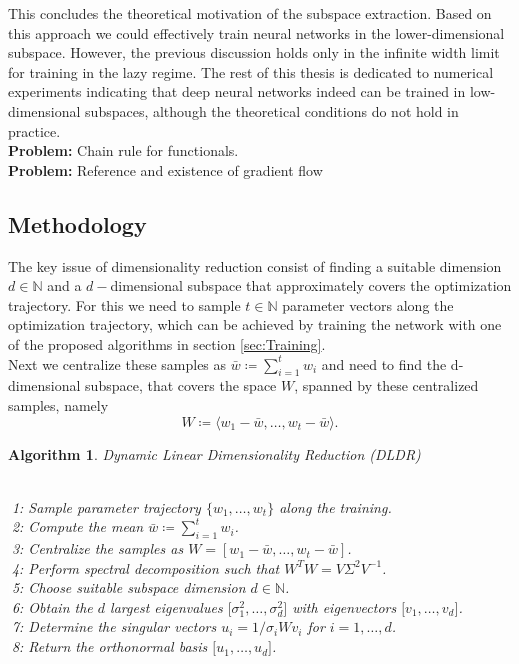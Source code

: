 \documentclass[11pt, a4paper]{article}
\newtheorem{algorithm}[theorem]{Algorithm}
\newcommand{\N}{\mathds{N}}
\begin{document}
This concludes the theoretical motivation of the subspace extraction. Based on this approach we could effectively train neural networks in the lower-dimensional subspace. However, the previous discussion holds only in the infinite width limit for training in the lazy regime. The rest of this thesis is dedicated to numerical experiments indicating that deep neural networks indeed can be trained in low-dimensional subspaces, although the theoretical conditions do not hold in practice. \\

\textbf{Problem:} Chain rule for functionals. \\
\textbf{Problem:} Reference and existence of gradient flow

\pagebreak
\subsection{Methodology}

The key issue of dimensionality reduction consist of finding a suitable dimension $d \in \N$ and a $d-$dimensional subspace that approximately covers the optimization trajectory. For this we need to sample $t \in \N$ parameter vectors along the optimization trajectory, which can be achieved by training the network with one of the proposed algorithms in section \ref{sec:Training}. \\

Next we centralize these samples as $\bar{w} \coloneq\sum_{i=1}^{t} w_i$ and need to find the d-dimensional subspace, that covers the space $W$, spanned by these centralized samples, namely
\[ W \coloneq \big \langle w_1 - \bar{w}, \dots, w_t - \bar{w} \big \rangle. \]

\begin{algorithm}
\caption{Dynamic Linear Dimensionality Reduction (DLDR)} \ \\
\textcolor{white}{$\Big |$}1: Sample parameter trajectory $\{ w_1, \dots, w_t\}$ along the training. \\
\textcolor{white}{$\Big |$}2: Compute the mean $\bar{w} \coloneq\sum_{i=1}^{t} w_i$. \\
\textcolor{white}{$\Big |$}3: Centralize the samples as $W = [w_1-\bar{w}, \dots, w_t - \bar{w}]$. \\
\textcolor{white}{$\Big |$}4: Perform spectral decomposition such that $W^TW = V \Sigma^2 V^{-1}$.  \\
\textcolor{white}{$\Big |$}5: Choose suitable subspace dimension $d \in \N$. \\
\textcolor{white}{$\Big |$}6: Obtain the $d$ largest eigenvalues $ \big [\sigma_1^2, \dots, \sigma_d^2 \big ]$ with eigenvectors $ \big [v_1, \dots, v_d \big ]$. \\
\textcolor{white}{$\Big |$}7: Determine the singular vectors $u_i = 1/\sigma_iWv_i$ for $i=1, \dots, d$. \\
\textcolor{white}{$\Big |$}8: Return the orthonormal basis $ \big [u_1, \dots, u_d \big ]$.
\end{algorithm}
\end{document}
